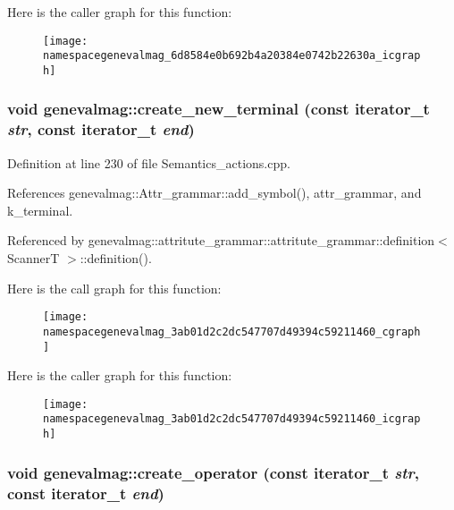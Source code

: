 Here is the caller graph for this function:\nopagebreak
\begin{figure}[H]
\begin{center}
\leavevmode
\texttt{[image: namespacegenevalmag\_6d8584e0b692b4a20384e0742b22630a\_icgraph]}
\end{center}
\end{figure}
\hypertarget{namespacegenevalmag_3ab01d2c2dc547707d49394c59211460}{
\subsubsection[{create\_\-new\_\-terminal}]{\setlength{\rightskip}{0pt plus 5cm}void genevalmag::create\_\-new\_\-terminal (const iterator\_\-t {\em str}, \/  const iterator\_\-t {\em end})}}
\label{namespacegenevalmag_3ab01d2c2dc547707d49394c59211460}




Definition at line 230 of file Semantics\_\-actions.cpp.

References genevalmag::Attr\_\-grammar::add\_\-symbol(), attr\_\-grammar, and k\_\-terminal.

Referenced by genevalmag::attritute\_\-grammar::attritute\_\-grammar::definition$<$ ScannerT $>$::definition().

Here is the call graph for this function:\nopagebreak
\begin{figure}[H]
\begin{center}
\leavevmode
\texttt{[image: namespacegenevalmag\_3ab01d2c2dc547707d49394c59211460\_cgraph]}
\end{center}
\end{figure}


Here is the caller graph for this function:\nopagebreak
\begin{figure}[H]
\begin{center}
\leavevmode
\texttt{[image: namespacegenevalmag\_3ab01d2c2dc547707d49394c59211460\_icgraph]}
\end{center}
\end{figure}
\hypertarget{namespacegenevalmag_fa1b5eab4ae88dcc8cdea82c8a94042e}{
\subsubsection[{create\_\-operator}]{\setlength{\rightskip}{0pt plus 5cm}void genevalmag::create\_\-operator (const iterator\_\-t {\em str}, \/  const iterator\_\-t {\em end})}}
\label{namespacegenevalmag_fa1b5eab4ae88dcc8cdea82c8a94042e}




